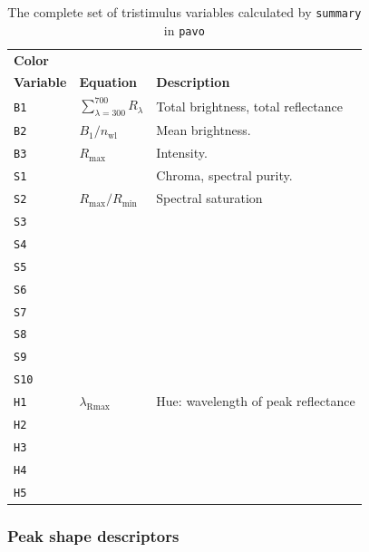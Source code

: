 \documentclass{article}
\newcommand{\pavo}{{\tt pavo}}  %
\newcommand{\code}[1]{{\tt #1}}  %
\begin{document}
\begin{table}[h]
\begin{center}
\begin{tabular}{l l l} \hline
{\bf Color} & \\
{\bf Variable} & {\bf Equation} & {\bf Description} \\ 
\hline
\code{B1} & {$\sum_{\lambda={300}}^{700} R_\lambda$} & \parbox[t]{3in}{Total brightness, total reflectance}  \\
\code{B2} & {$B_\text{1}/n_\text{wl}$} & \parbox[t]{3in}{Mean brightness.} \\
\code{B3} & {$R_\text{max}$} & \parbox[t]{3in}{Intensity.} \\
\code{S1} & {} & \parbox[t]{3in}{Chroma, spectral purity.} \\
\code{S2} & {$R_\text{max}/R_\text{min}$} & \parbox[t]{3in}{Spectral saturation} \\
\code{S3} & {} & \parbox[t]{3in}{} \\
\code{S4} & {} & \parbox[t]{3in}{} \\
\code{S5} & {} & \parbox[t]{3in}{} \\
\code{S6} & {} & \parbox[t]{3in}{} \\
\code{S7} & {} & \parbox[t]{3in}{} \\
\code{S8} & {} & \parbox[t]{3in}{} \\
\code{S9} & {} & \parbox[t]{3in}{} \\
\code{S10} & {} & \parbox[t]{3in}{} \\
\code{H1} & {$\lambda_\text{Rmax}$} & \parbox[t]{3in}{Hue: wavelength of peak reflectance} \\
\code{H2} & {} & \parbox[t]{3in}{} \\
\code{H3} & {} & \parbox[t]{3in}{} \\
\code{H4} & {} & \parbox[t]{3in}{} \\
\code{H5} & {} & \parbox[t]{3in}{} \\
\hline
\end{tabular}
\end{center}
\caption{\label{table:tristim}
The complete set of tristimulus variables calculated by \code{summary} in \pavo{}}
\end{table}

\clearpage{}

\subsubsection{Peak shape descriptors}
\end{document}
